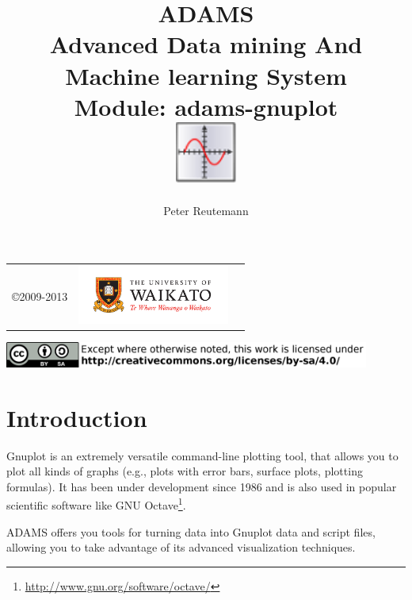 \documentclass[a4paper]{book}
\title{
  \textbf{ADAMS} \\
  {\Large \textbf{A}dvanced \textbf{D}ata mining \textbf{A}nd \textbf{M}achine
  learning \textbf{S}ystem} \\
  {\Large Module: adams-gnuplot} \\
  \vspace{1cm}
  \includegraphics[width=2cm]{images/gnuplot-module.png} \\
}
\author{
  Peter Reutemann
}
\begin{document}
\begin{titlepage}
\maketitle

\thispagestyle{empty}
\center
\begin{table}[b]
	\begin{tabular}{c l l}
		\parbox[c][2cm]{2cm}{\copyright 2009-2013} &
		\parbox[c][2cm]{5cm}{\includegraphics[width=5cm]{images/coat_of_arms.pdf}} \\
	\end{tabular}
	\includegraphics[width=12cm]{images/cc.png} \\
\end{table}

\end{titlepage}

\tableofcontents
\listoffigures

\chapter{Introduction}
Gnuplot\cite{gnuplot} is an extremely
versatile command-line plotting tool, that allows you to plot all kinds of
graphs (e.g., plots with error bars, surface plots, plotting formulas). It
has been under development since 1986 and is also used in popular scientific
software like GNU Octave\footnote{\url{http://www.gnu.org/software/octave/}{}}.

ADAMS offers you tools for turning data into Gnuplot data and script files, 
allowing you to take advantage of its advanced visualization techniques.
\end{document}
